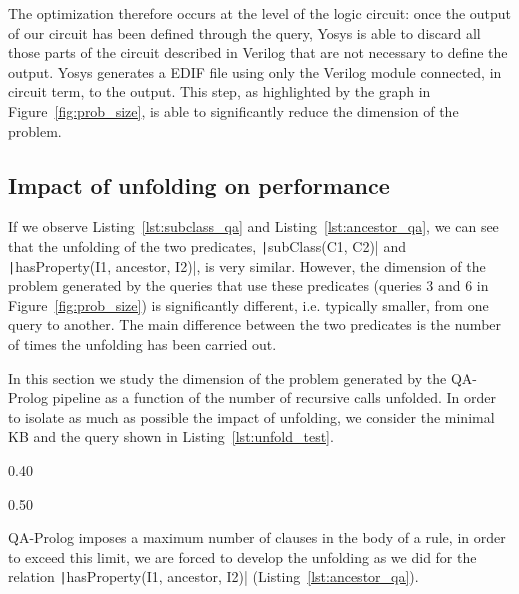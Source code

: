 The optimization therefore occurs at the level of the logic circuit: once the output of our circuit has been defined through the query, Yosys is able to discard all those parts of the circuit described in Verilog that are not necessary to define the output. Yosys generates a EDIF file using only the Verilog module connected, in circuit term, to the output. This step, as highlighted by the graph in Figure~\ref{fig:prob_size}, is able to significantly reduce the dimension of the problem.

\subsection{Impact of unfolding on performance}
\label{sec:unfold_performance}
If we observe Listing~\ref{lst:subclass_qa} and Listing~\ref{lst:ancestor_qa}, we can see that the unfolding of the two predicates, \texttt|subClass(C1, C2)| and \texttt|hasProperty(I1, ancestor, I2)|, is very similar. However, the dimension of the problem generated by the queries that use these predicates (queries $3$ and $6$ in Figure~\ref{fig:prob_size}) is significantly different, i.e. typically smaller, from one query to another. The main difference between the two predicates is the number of times the unfolding has been carried out.

In this section we study the dimension of the problem generated by the QA-Prolog pipeline as a function of the number of recursive calls unfolded. In order to isolate as much as possible the impact of unfolding, we consider the minimal KB and the query shown in Listing~\ref{lst:unfold_test}.

\begin{listing}[h]
	\centering
	\begin{sublisting}[c]{0.40\linewidth}
		\caption{Prolog File (KB)}
	\end{sublisting}
	\qquad
	\begin{sublisting}[c]{0.50\linewidth}
		\caption{Query}
	\end{sublisting}
	\caption{Input unfold}
	\label{lst:unfold_test}
\end{listing}

QA-Prolog imposes a maximum number of clauses in the body of a rule, in order to exceed this limit, we are forced to develop the unfolding as we did for the relation \texttt|hasProperty(I1, ancestor, I2)| (Listing~\ref{lst:ancestor_qa}).

